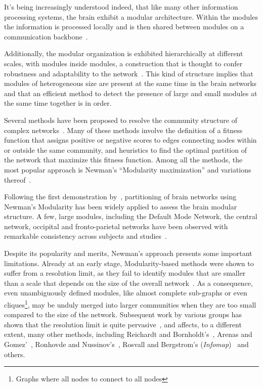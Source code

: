 It's being increasingly understood indeed, that like many other information processing systems, the brain exhibit a modular architecture.
Within the modules the information is processed locally and is then shared between modules on a communication backbone~\cite{dereus2013a,vandenheuvel2013a}.

Additionally, the modular organization is exhibited hierarchically at different scales, with modules inside modules, a construction that is thought to confer robustness and adaptability to the network~\cite{meunier2010}. This kind of structure implies that modules of heterogeneous size are present at the same time in the brain networks and that an efficient method to detect the presence of large and small modules at the same time together is in order.

Several methods have been proposed to resolve the community structure of complex networks~\cite{fortunato2010,lancichinetti2009,fortunato2016}.
Many of these methods involve the definition of a fitness function that assigns positive or negative scores to edges connecting nodes within or outside the same community, and heuristics to find the optimal partition of the network that maximize this fitness function.
Among all the methods, the most popular approach is Newman's ``Modularity maximization'' and variations thereof~\cite{newman2006}.

Following the first demonstration by~\cite{schwarz2008}, partitioning of brain networks using Newman's Modularity has been widely applied to assess the brain modular structure.
A few, large modules, including the Default Mode Network, the central network, occipital and fronto-parietal networks have been observed with remarkable consistency across subjects and studies~\cite{meunier2010,wang2010}. 

Despite its popularity and merits, Newman's approach presents some important limitations.
Already at an early stage, Modularity-based methods were shown to suffer from a resolution limit, as they fail to identify modules that are smaller than a scale that depends on the size of the overall network~\cite{fortunato2007}.
As a consequence, even unambiguously defined modules, like almost complete sub-graphs or even cliques\footnote{Graphs where all nodes to connect to all nodes}, may be unduly merged into larger communities when they are too small compared to the size of the network.
Subsequent work by various groups has shown that the resolution limit is quite pervasive~\cite{lancichinetti2009,traag2011,squartini2015,lancichinetti2011,kawamoto2015}, and affects, to a different extent, many other methods, including Reichardt and Bornholdt’s~\cite{reichardt2006}, Arenas and Gomez'~\cite{arenas2008}, Ronhovde and Nussinov's~\cite{ronhovde2009}, Rosvall and Bergstrom's (\emph{Infomap})~\cite{rosvall2008,kawamoto2015} and others.

